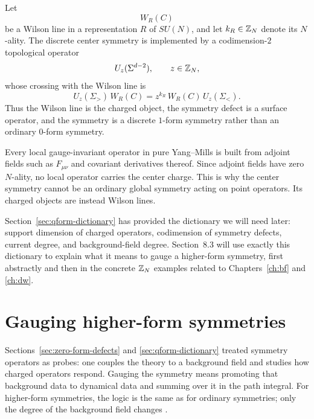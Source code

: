 \begin{example}\label{ex:center-symmetry}
Let
\begin{equation*}
W_R(C)
\end{equation*}
be a Wilson line in a representation $R$ of $SU(N)$, and let $k_R\in \mathbb{Z}_N$ denote its $N$-ality. The discrete center symmetry is implemented by a codimension-$2$ topological operator
\begin{equation*}
U_z(\Sigma^{d-2}),
\qquad
z\in \mathbb{Z}_N,
\end{equation*}
whose crossing with the Wilson line is
\begin{equation}\label{eq:center-crossing}
U_z(\Sigma_{>})\,W_R(C)
=
z^{k_R}\,W_R(C)\,U_z(\Sigma_{<}).
\end{equation}
Thus the Wilson line is the charged object, the symmetry defect is a surface operator, and the symmetry is a discrete $1$-form symmetry rather than an ordinary $0$-form symmetry.
\end{example}

\begin{remark}\label{rem:center-neutral}
Every local gauge-invariant operator in pure Yang--Mills is built from adjoint fields such as $F_{\mu\nu}$ and covariant derivatives thereof. Since adjoint fields have zero $N$-ality, no local operator carries the center charge. This is why the center symmetry cannot be an ordinary global symmetry acting on point operators. Its charged objects are instead Wilson lines.
\end{remark}

\begin{remark}\label{rem:qform-gauging-forward}
Section~\ref{sec:qform-dictionary} has provided the dictionary we will need later: support dimension of charged operators, codimension of symmetry defects, current degree, and background-field degree. Section~8.3 will use exactly this dictionary to explain what it means to gauge a higher-form symmetry, first abstractly and then in the concrete $\mathbb{Z}_N$ examples related to Chapters~\ref{ch:bf} and \ref{ch:dw}.
\end{remark}

\section{Gauging higher-form symmetries}\label{sec:qform-gauging}

Sections~\ref{sec:zero-form-defects} and \ref{sec:qform-dictionary} treated symmetry operators as probes: one couples the theory to a background field and studies how charged operators respond. Gauging the symmetry means promoting that background data to dynamical data and summing over it in the path integral. For higher-form symmetries, the logic is the same as for ordinary symmetries; only the degree of the background field changes \cite{GKSW2015,Bhardwaj2023Lectures}.

